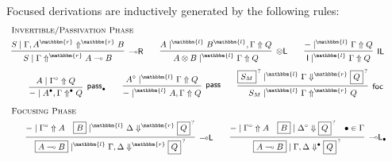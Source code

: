 \documentclass[runningheads]{llncs}
\newcommand{\tl}{\otimes \mathsf{L}}
\newcommand{\lright}{{\multimap}\mathsf{R}}
\newcommand{\lleft}{{\multimap}\mathsf{L}}
\newcommand{\pass}{\mathsf{pass}}
\newcommand{\unitl}{\mathsf{IL}}
\newcommand{\otL}{\tl}
\newcommand{\lolliR}{\lright}
\newcommand{\lolliL}{\lleft}
\newcommand{\IL}{\unitl}
\newcommand{\ot}{\otimes}
\newcommand{\lolli}{\multimap}
\newcommand{\I}{\mathsf{I}}
\newcommand{\LI}{\mathsf{LI}}
\newcommand{\Pass}{\mathsf{P}}
\newcommand{\xvdash}{\vdash^{x}}
\newcommand{\up}{\Uparrow}
\newcommand{\dn}{\Downarrow}
\newcommand{\sw}{\mathsf{sw}}
\newcommand{\focL}{\mathsf{foc_L}}
\newcommand{\foc}{\mathsf{foc}}
\newcommand{\focR}{\mathsf{foc_R}}
\newcommand{\focLR}{\mathsf{foc_{M}}}
\renewcommand{\r}{\mathbbm{r}}
\renewcommand{\l}{\mathbbm{l}}
\begin{document}
Focused derivations are inductively generated by the following rules:
\begin{equation}\label{eq:focus}\small
  \begin{array}{c}
    \multicolumn{1}{l}{\text{\textsc{Invertible/Passivation Phase}}} \\[4pt]
      \infer[\lolliR]{S \mid \Gamma \up^{\r} A \lolli B}{S \mid \Gamma , A^{\r} \up^{\r} B}
    \qquad
    \infer[\otL]{A \ot B \mid^\l \Gamma \up Q}{A \mid^\l  B^{\l} , \Gamma \up Q}
    \qquad
      \infer[\IL]{\I \mid^\l \Gamma \up Q}{- \mid^\l \Gamma \up Q}    
    \qquad
    \\[6pt]    
    \infer[\pass_\bullet]{- \mid A^{\bullet} , \Gamma \up^{\bullet} Q }{
      A\mid \Gamma^{\circ} \up Q
    }
    \qquad
    \infer[\pass]{- \mid^{\l} A , \Gamma \up Q }{
      A^\circ \mid^{\l} \Gamma \up Q
    }
    \qquad
        \infer[\foc]{S_M \mid^{\l} \Gamma \up^{\r} Q}{
      \fbox{$S_M$}^{\, ?} \mid^\l \Gamma \dn^{\r} \fbox{$Q$}^{\, ?}
    }
    \\[9pt]
    \multicolumn{1}{l}{\text{\textsc{Focusing Phase}}} \\[4pt]
    \infer[\lolliL]{\fbox{$A \lolli B$} \mid^\l \Gamma , \Delta \dn^\r \fbox{$Q$}^{\,?}}{
      - \mid \Gamma^\circ \up A
      &
      \fbox{$B$} \mid^\l \Delta \dn^\r \fbox{$Q$}^{\,?}
    }
    \qquad
    \infer[\lolliL_\bullet]{\fbox{$A \lolli B$} \mid \Gamma , \Delta \dn^\bullet \fbox{$Q$}^{\,?}}{
      - \mid \Gamma^{\circ} \up A
      &
      \fbox{$B$} \mid \Delta^{\circ} \dn \fbox{$Q$}^{\,?}
      &
      \bullet \in \Gamma
}
\end{array}
\end{equation}
\end{document}

